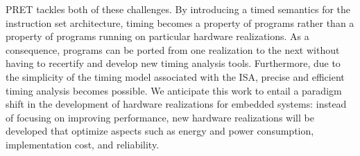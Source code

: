               PRET tackles both of these challenges. By introducing a
               timed semantics for the instruction set architecture,
               timing becomes a property of programs rather than a
               property of programs running on particular hardware
               realizations. As a consequence, programs can be ported
               from one realization to the next without having to
               recertify and develop new timing analysis
               tools. Furthermore, due to the simplicity of the timing
               model associated with the ISA, precise and efficient
               timing analysis becomes possible. We anticipate this
               work to entail a paradigm shift in the development of
               hardware realizations for embedded systems: instead of
               focusing on improving performance, new hardware
               realizations will be developed that optimize aspects
               such as energy and power consumption, implementation
               cost, and reliability.

